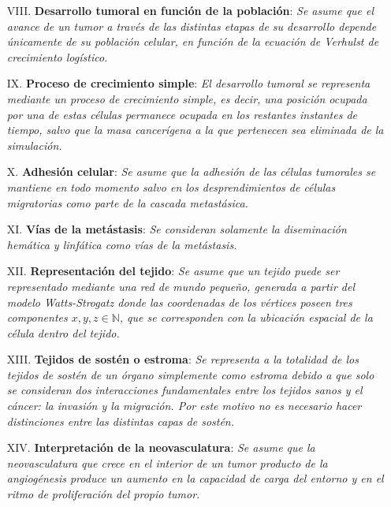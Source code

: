 \begin{enumerate}
\item [{VIII.}] \textbf{Desarrollo tumoral en funci\'on de la poblaci\'on}: \emph{Se asume que el avance de un tumor a trav\'es de las distintas etapas de su desarrollo depende \'unicamente de su poblaci\'on celular, en funci\'on de la ecuaci\'on de Verhulst de crecimiento log\'istico.} \label{hVIII}

\item [{IX.}] \textbf{Proceso de crecimiento simple}: \emph{El desarrollo tumoral se representa mediante un proceso de crecimiento simple, es decir, una posici\'on ocupada por una de estas c\'elulas permanece ocupada en los restantes instantes de tiempo, salvo que la masa cancer\'igena a la que pertenecen sea eliminada de la simulaci\'on. } \label{hIX}

\item [{X.}] \textbf{Adhesi\'on celular}: \emph{Se asume que la adhesi\'on de las c\'elulas tumorales se mantiene en todo momento salvo en los desprendimientos de c\'elulas migratorias como parte de la cascada metast\'asica.} \label{hX}

\item [{XI.}] \textbf{V\'ias de la met\'astasis}: \emph{Se consideran solamente la diseminaci\'on hem\'atica y linf\'atica como v\'ias de la met\'astasis.} \label{hXI}

\item [{XII.}] \textbf{Representaci\'on del tejido}: \emph{Se asume que un tejido puede ser representado mediante una red de mundo peque\~no, generada a partir del modelo Watts-Strogatz donde las coordenadas de los v\'ertices poseen tres componentes $x,y,z \in \mathbb{N}$, que se corresponden con la ubicaci\'on espacial de la c\'elula dentro del tejido.} \label{hXII}

\item [{XIII.}] \textbf{Tejidos de sost\'en o estroma}: \emph{Se representa a la totalidad de los tejidos de sost\'en de un \'organo simplemente como estroma debido a que solo se consideran dos interacciones fundamentales entre los tejidos sanos y el c\'ancer: la invasi\'on y la migraci\'on. Por este motivo no es necesario hacer distinciones entre las distintas capas de sost\'en.} \label{hXIII}

\item [{XIV.}] \textbf{Interpretaci\'on de la neovasculatura}: \emph{Se asume que la neovasculatura que crece en el interior de un tumor producto de la angiog\'enesis produce un aumento en la capacidad de carga del entorno y en el ritmo de proliferaci\'on del propio tumor.} \label{hXIV}


\end{enumerate}
